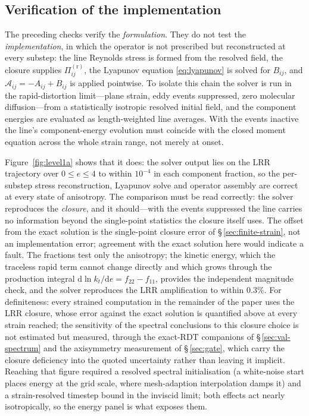 \documentclass[lineno]{JFM-FLM_Au}
\begin{document}
\subsection{Verification of the implementation}\label{sec:level1a}

The preceding checks verify the \emph{formulation}. They do not test the
\emph{implementation}, in which the operator is not prescribed but
reconstructed at every substep: the line Reynolds stress is formed from
the resolved field, the closure supplies $\Pi^{(\mathrm r)}_{ij}$, the
Lyapunov equation \eqref{eq:lyapunov} is solved for $B_{ij}$, and
$\mathcal{A}_{ij}=-A_{ij}+B_{ij}$ is applied pointwise. To isolate this
chain the solver is run in the rapid-distortion limit---plane strain,
eddy events suppressed, zero molecular diffusion---from a statistically
isotropic resolved initial field, and the component energies are
evaluated as length-weighted line averages. With the events inactive the
line's component-energy evolution must coincide with the closed moment
equation across the whole strain range, not merely at onset.

Figure~\ref{fig:level1a} shows that it does: the solver output lies on
the LRR trajectory over $0\le e\le4$ to within $10^{-4}$ in each
component fraction, so the per-substep stress reconstruction, Lyapunov
solve and operator assembly are correct at every state of anisotropy.
The comparison must be read correctly: the solver reproduces the
\emph{closure}, and it should---with the events suppressed the line
carries no information beyond the single-point statistics the closure
itself uses. The offset from the exact solution is the single-point
closure error of \S\,\ref{sec:finite-strain}, not an implementation
error; agreement with the exact solution here would indicate a fault.
The fractions test only the anisotropy; the kinetic energy, which the
traceless rapid term cannot change directly and which grows through the
production integral
$\mathrm{d}\ln k_t/\mathrm{d}e=f_{22}-f_{11}$, provides the independent
magnitude check, and the solver reproduces the LRR amplification to
within $0.3\%$. For definiteness: every strained computation in the
remainder of the paper uses the LRR closure, whose error against the
exact solution is quantified above at every strain reached; the
sensitivity of the spectral conclusions to this closure choice is not
estimated but measured, through the exact-RDT companions of
\S\,\ref{sec:val-spectrum} and the axisymmetry measurement of
\S\,\ref{sec:gate}, which carry the closure deficiency into the quoted
uncertainty rather than leaving it implicit. Reaching that figure required a resolved spectral
initialisation (a white-noise start places energy at the grid scale,
where mesh-adaption interpolation damps it) and a strain-resolved
timestep bound in the inviscid limit; both effects act nearly
isotropically, so the energy panel is what exposes them.
\end{document}
